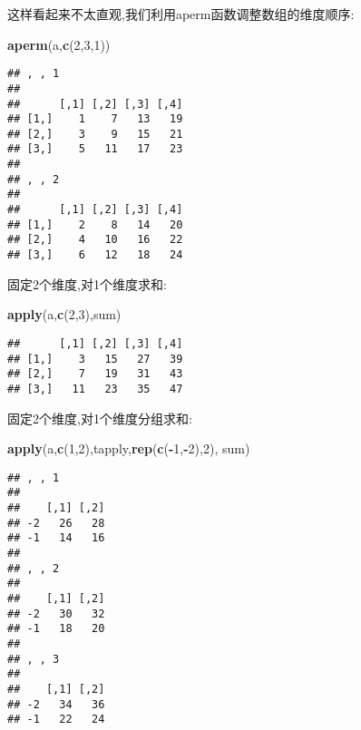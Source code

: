 \documentclass[]{ctexbook}
\newenvironment{Shaded}{\begin{snugshade}}{\end{snugshade}}
\newcommand{\DecValTok}[1]{\textcolor[rgb]{0.00,0.00,0.81}{#1}}
\newcommand{\KeywordTok}[1]{\textcolor[rgb]{0.13,0.29,0.53}{\textbf{#1}}}
\newcommand{\NormalTok}[1]{#1}
\newcommand{\OperatorTok}[1]{\textcolor[rgb]{0.81,0.36,0.00}{\textbf{#1}}}
\begin{document}
这样看起来不太直观,我们利用aperm函数调整数组的维度顺序:

\begin{Shaded}
\begin{Highlighting}[]
\KeywordTok{aperm}\NormalTok{(a,}\KeywordTok{c}\NormalTok{(}\DecValTok{2}\NormalTok{,}\DecValTok{3}\NormalTok{,}\DecValTok{1}\NormalTok{))}
\end{Highlighting}
\end{Shaded}

\begin{verbatim}
## , , 1
## 
##      [,1] [,2] [,3] [,4]
## [1,]    1    7   13   19
## [2,]    3    9   15   21
## [3,]    5   11   17   23
## 
## , , 2
## 
##      [,1] [,2] [,3] [,4]
## [1,]    2    8   14   20
## [2,]    4   10   16   22
## [3,]    6   12   18   24
\end{verbatim}

固定2个维度,对1个维度求和:

\begin{Shaded}
\begin{Highlighting}[]
\KeywordTok{apply}\NormalTok{(a,}\KeywordTok{c}\NormalTok{(}\DecValTok{2}\NormalTok{,}\DecValTok{3}\NormalTok{),sum)}
\end{Highlighting}
\end{Shaded}

\begin{verbatim}
##      [,1] [,2] [,3] [,4]
## [1,]    3   15   27   39
## [2,]    7   19   31   43
## [3,]   11   23   35   47
\end{verbatim}

固定2个维度,对1个维度分组求和:

\begin{Shaded}
\begin{Highlighting}[]
\KeywordTok{apply}\NormalTok{(a,}\KeywordTok{c}\NormalTok{(}\DecValTok{1}\NormalTok{,}\DecValTok{2}\NormalTok{),tapply,}\KeywordTok{rep}\NormalTok{(}\KeywordTok{c}\NormalTok{(}\OperatorTok{-}\DecValTok{1}\NormalTok{,}\OperatorTok{-}\DecValTok{2}\NormalTok{),}\DecValTok{2}\NormalTok{), sum)}
\end{Highlighting}
\end{Shaded}

\begin{verbatim}
## , , 1
## 
##    [,1] [,2]
## -2   26   28
## -1   14   16
## 
## , , 2
## 
##    [,1] [,2]
## -2   30   32
## -1   18   20
## 
## , , 3
## 
##    [,1] [,2]
## -2   34   36
## -1   22   24
\end{verbatim}
\end{document}
